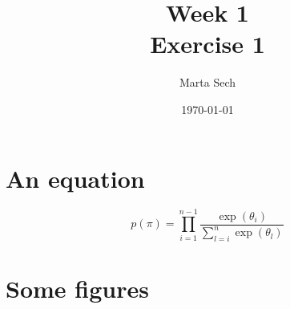 \documentclass[10pt, fullpage, a4paper, titlepage]{article}
\title{Week 1\\ \small Exercise 1}
\author{Marta Sech}
\date{\today}
\begin{document}
\maketitle
\newpage

\section{An equation}
\begin{equation}
p(\pi) = \prod_{i=1}^{n-1}  \frac{\exp(\theta_{i})}{\sum_{l=i}^{n} \exp(\theta_{l})} 
\end{equation}
\newpage
\section{Some figures}
\begin{figure}[h]
	\begin{center}
\end{center}
\end{figure}
\end{document}
